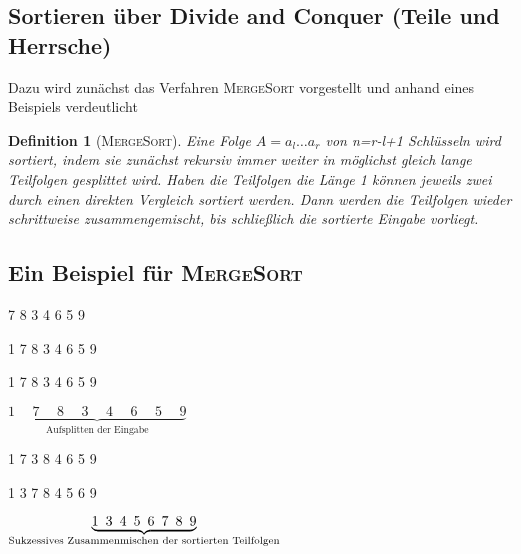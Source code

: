 \documentclass[ngerman,draft,parskip=half*,twoside]{scrreprt}
\theoremstyle{break}
\newtheorem{definition}{Definition}
\begin{document}
\subsection{Sortieren über Divide and Conquer (Teile und Herrsche)}
%
%
Dazu wird zunächst das Verfahren \textsc{MergeSort} vorgestellt und anhand eines Beispiels verdeutlicht
\begin{definition}[\textsc{MergeSort}]
        Eine Folge $A=a_l\ldots a_r$ von n=r-l+1 Schlüsseln wird sortiert, indem sie zunächst rekursiv immer weiter
	in möglichst gleich lange Teilfolgen gesplittet wird. Haben die Teilfolgen die Länge 1 können jeweils zwei durch einen direkten
	Vergleich sortiert werden. Dann werden die Teilfolgen wieder schrittweise zusammengemischt, bis schließlich die sortierte Eingabe
	vorliegt. 
\end{definition}

\subsection{Ein Beispiel für \textsc{MergeSort}}

 7 8 3 4 6 5 9
\medskip

1 7 8 3 \hspace{10pt} 4 6 5 9
\medskip

1 7 \hspace{10pt} 8 3 \hspace{10pt} 4 6 \hspace{10pt} 5 9
\medskip

$\underbrace{1 \hspace{15pt} 7 \hspace{15pt} 8 \hspace{15pt} 3 \hspace{15pt} 4 \hspace{15pt} 6 \hspace{15pt} 5 \hspace{15pt}
9}_{\text{Aufsplitten der Eingabe}}$
\medskip

1 7 \hspace{10pt} 3 8 \hspace{10pt} 4 6 \hspace{10pt} 5 9
\medskip

1 3 7 8 \hspace{10pt} 4 5 6 9
\medskip

$\underbrace{1 \hspace{5pt} 3 \hspace{5pt} 4 \hspace{5pt} 5 \hspace{5pt} 6 \hspace{5pt} 7 \hspace{5pt} 8 \hspace{5pt}
9}_{\textrm{\textup{Sukzessives Zusammenmischen der sortierten Teilfolgen}}}$
\end{document}
